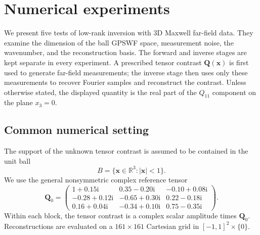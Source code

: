 
\section{Numerical experiments}
\label{sec:maxwell-gpswf-numerics}

We present five tests of low-rank inversion with 3D Maxwell far-field data.
They examine the dimension of the ball GPSWF space, measurement noise, the
wavenumber, and the reconstruction basis. The forward and inverse stages are
kept separate in every experiment. A prescribed tensor contrast
$\mathbf{Q}(\mathbf{x})$ is first used to generate far-field measurements; the
inverse stage then uses only these measurements to recover Fourier samples and
reconstruct the contrast. Unless otherwise stated, the displayed quantity is
the real part of the $Q_{11}$ component on the plane $x_3=0$.

\subsection{Common numerical setting}
\label{subsec:maxwell-gpswf-setup}

The support of the unknown tensor contrast is assumed to be contained in the
unit ball
\[
    B=\{\mathbf{x}\in\mathbb{R}^3:|\mathbf{x}|<1\}.
\]
We use the general nonsymmetric complex reference tensor
\[
\mathbf{Q}_0=
\begin{pmatrix}
1+0.15\mathrm{i} & 0.35-0.20\mathrm{i} & -0.10+0.08\mathrm{i}\\
-0.28+0.12\mathrm{i} & -0.65+0.30\mathrm{i} & 0.22-0.18\mathrm{i}\\
0.16+0.04\mathrm{i} & -0.34+0.10\mathrm{i} & 0.75-0.35\mathrm{i}
\end{pmatrix}.
\]
Within each block, the tensor contrast is a complex scalar amplitude times
$\mathbf{Q}_0$. Reconstructions are evaluated on a $161\times161$ Cartesian
grid in $[-1,1]^2\times\{0\}$.

